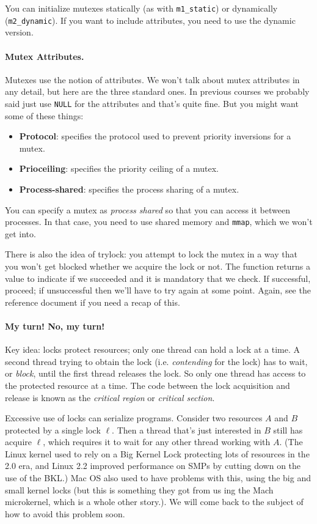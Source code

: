 \documentclass[a4paper]{report}
\begin{document}
You can initialize mutexes statically (as with {\tt m1\_static}) or
dynamically ({\tt m2\_dynamic}). If you want to include attributes,
you need to use the dynamic version.

\paragraph{Mutex Attributes.} Mutexes use the notion of attributes.
We won't talk about mutex attributes in any detail, but here are the three standard ones. In previous courses we probably said just use \texttt{NULL} for the attributes and that's quite fine. But you might want some of these things:
  \begin{itemize}
    \item {\bf Protocol}: specifies the protocol used to prevent priority
      inversions for a mutex.
    \item {\bf Prioceiling}: specifies the priority ceiling of a mutex.
    \item {\bf Process-shared}: specifies the process sharing of a mutex.
  \end{itemize}
  You can specify a mutex as {\it process shared} so that you can access it
  between processes. In that case, you need to use shared memory and {\tt mmap},
  which we won't get into.

There is also the idea of trylock: you attempt to lock the mutex in a way that you won't get blocked whether we acquire the lock or not. The function returns a value to indicate if we succeeded and it is mandatory that we check. If successful, proceed; if unsuccessful then we'll have to try again at some point. Again, see the reference document if you need a recap of this.



\paragraph{My turn! No, my turn!} Key idea: locks protect resources; only one thread
can hold a lock at a time. A second thread trying to obtain the lock
(i.e. \emph{contending} for the lock) has to wait, or \emph{block},
until the first thread releases the lock. So only one thread has
access to the protected resource at a time. The code between the lock
acquisition and release is known as the \emph{critical region} or \emph{critical section}.

Excessive use of locks can serialize programs. Consider two resources
$A$ and $B$ protected by a single lock $\ell$. Then a thread that's
just interested in $B$ still has acquire $\ell$, which requires it to
wait for any other thread working with $A$. (The Linux kernel used to
rely on a Big Kernel Lock protecting lots of resources in the 2.0 era,
and Linux 2.2 improved performance on SMPs by cutting down on the use
of the BKL.) Mac OS also used to have problems with this, using the
big and small kernel locks (but this is something they got from us ing
the Mach microkernel, which is a whole other story.). We will come back to
the subject of how to avoid this problem soon.
\end{document}
